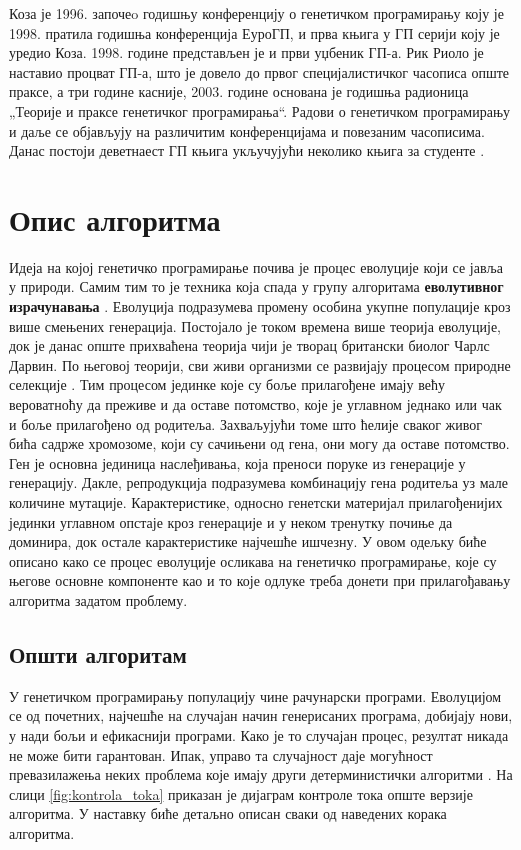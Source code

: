 \documentclass[a4paper]{article}
\begin{document}
Коза је 1996. започеo годишњу конференцију о генетичком програмирању  коју је 1998. пратила годишња конференција ЕуроГП, и прва књига у ГП серији коју је уредио Коза. 1998. године представљен је и први уџбеник ГП-а. Рик Риоло је наставио процват ГП-а, што је довело до првог специјалистичког часописа опште праксе, а три године касније, 2003. године основана је годишња радионица „Теорије и праксе генетичког програмирања“. Радови о генетичком програмирању и даље се објављују на различитим конференцијама и повезаним часописима. Данас постоји деветнаест ГП књига укључујући неколико књига за студенте \cite{genetic_algorithms}.


\section{Опис алгоритма}

Идеја на којој генетичко програмирање почива је процес еволуције који се јавља у природи. Самим тим то је техника која спада у групу алгоритама  \textbf{еволутивног израчунавања} \cite{compIntelligence}. Еволуција подразумева промену особина укупне популације кроз више смењених генерација. Постојало је током времена више теорија еволуције, док је данас опште прихваћена теорија чији је творац британски биолог Чарлс Дарвин. По његовој теорији, сви живи организми се развијају процесом природне селекције \cite{darwin1859}. Тим процесом јединке које су боље прилагођене имају већу вероватноћу да преживе и да оставе потомство, које је углавном једнако или чак и боље прилагођено од родитеља. Захваљујући томе што ћелије сваког живог бића садрже хромозоме, који су сачињени од гена, они могу да оставе потомство. Ген је основна јединица наслеђивања, која преноси поруке из генерације у генерацију. Дакле, репродукција подразумева комбинацију гена родитеља уз мале количине мутације. Карактеристике, односно генетски материјал прилагођенијих јединки углавном опстаје кроз генерације и у неком тренутку почиње да доминира, док остале карактеристике најчешће ишчезну. У овом одељку биће описано како се процес еволуције осликава на генетичко програмирање, које су његове основне компоненте као и то које одлуке треба донети при прилагођавању алгоритма задатом проблему.

\subsection{Општи алгоритам}
\label{text:opsti_algoritam}
\bigskip

У генетичком програмирању популацију чине рачунарски програми. Еволуцијом се од почетних, најчешће на случајан начин генерисаних програма, добијају нови, у нади бољи и ефикаснији програми. Како је то случајан процес, резултат никада не може бити гарантован. Ипак, управо та случајност даје могућност превазилажења неких проблема које имају други детерминистички алгоритми \cite{fieldGuidetoGP}. На слици \ref{fig:kontrola_toka} приказан је дијаграм контроле тока опште верзије алгоритма. У наставку биће детаљно описан сваки од наведених корака алгоритма.
\end{document}
